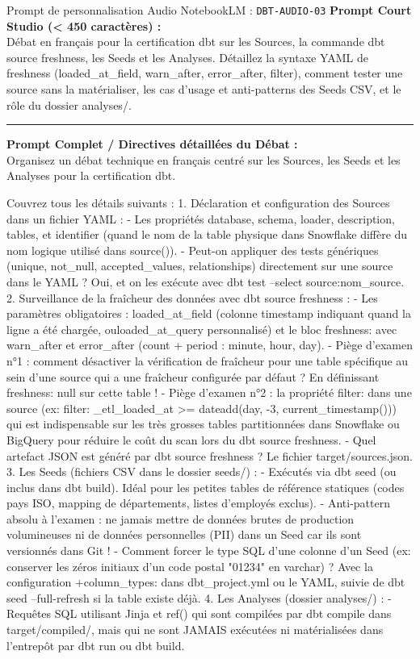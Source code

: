 \documentclass[11pt,a4paper]{article}
\begin{document}
\begin{promptbox}{Prompt de personnalisation Audio NotebookLM : \texttt{DBT-AUDIO-03}}
\textbf{Prompt Court Studio (< 450 caractères) :}\\
Débat en français pour la certification dbt sur les Sources, la commande dbt source freshness, les Seeds et les Analyses. Détaillez la syntaxe YAML de freshness (loaded\_at\_field, warn\_after, error\_after, filter), comment tester une source sans la matérialiser, les cas d'usage et anti-patterns des Seeds CSV, et le rôle du dossier analyses/.

\medskip\hrule\medskip
\textbf{Prompt Complet / Directives détaillées du Débat :}\\
Organisez un débat technique en français centré sur les Sources, les Seeds et les Analyses pour la certification dbt.

Couvrez tous les détails suivants :
1. Déclaration et configuration des Sources dans un fichier YAML :
- Les propriétés database, schema, loader, description, tables, et identifier (quand le nom de la table physique dans Snowflake diffère du nom logique utilisé dans source()).
- Peut-on appliquer des tests génériques (unique, not\_null, accepted\_values, relationships) directement sur une source dans le YAML ? Oui, et on les exécute avec dbt test --select source:nom\_source.
2. Surveillance de la fraîcheur des données avec dbt source freshness :
- Les paramètres obligatoires : loaded\_at\_field (colonne timestamp indiquant quand la ligne a été chargée, ouloaded\_at\_query personnalisé) et le bloc freshness: avec warn\_after et error\_after (count + period : minute, hour, day).
- Piège d'examen n°1 : comment désactiver la vérification de fraîcheur pour une table spécifique au sein d'une source qui a une fraîcheur configurée par défaut ? En définissant freshness: null sur cette table !
- Piège d'examen n°2 : la propriété filter: dans une source (ex: filter: \_etl\_loaded\_at >= dateadd(day, -3, current\_timestamp())) qui est indispensable sur les très grosses tables partitionnées dans Snowflake ou BigQuery pour réduire le coût du scan lors du dbt source freshness.
- Quel artefact JSON est généré par dbt source freshness ? Le fichier target/sources.json.
3. Les Seeds (fichiers CSV dans le dossier seeds/) :
- Exécutés via dbt seed (ou inclus dans dbt build). Idéal pour les petites tables de référence statiques (codes pays ISO, mapping de départements, listes d'employés exclus).
- Anti-pattern absolu à l'examen : ne jamais mettre de données brutes de production volumineuses ni de données personnelles (PII) dans un Seed car ils sont versionnés dans Git !
- Comment forcer le type SQL d'une colonne d'un Seed (ex: conserver les zéros initiaux d'un code postal "01234" en varchar) ? Avec la configuration +column\_types: dans dbt\_project.yml ou le YAML, suivie de dbt seed --full-refresh si la table existe déjà.
4. Les Analyses (dossier analyses/) :
- Requêtes SQL utilisant Jinja et ref() qui sont compilées par dbt compile dans target/compiled/, mais qui ne sont JAMAIS exécutées ni matérialisées dans l'entrepôt par dbt run ou dbt build.
\end{promptbox}
\end{document}

